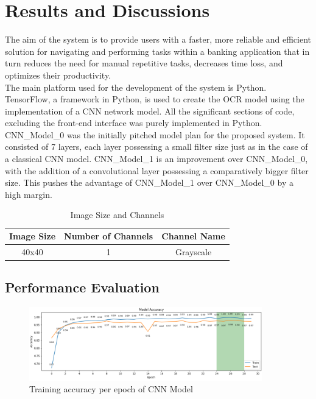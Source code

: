 \chapter{Results and Discussions}
\setcounter{equation}{0}

The aim of the system is to provide users with a faster, more reliable and efficient solution for navigating and performing tasks within a banking application that in turn reduces the need for manual repetitive tasks, decreases time loss, and optimizes their productivity.\\

\noindent The main platform used for the development of the system is Python. TensorFlow, a framework in Python, is used to create the OCR model using the implementation of a CNN network model. All the significant sections of code, excluding the front-end interface was purely implemented in Python.\\

\noindent
CNN\_Model\_0 was the initially pitched model plan for the proposed system. It consisted of 7 layers, each layer possessing a small filter size just as in the case of a classical CNN model. CNN\_Model\_1 is an improvement over CNN\_Model\_0, with the addition of a convolutional layer possessing a comparatively bigger filter size. This pushes the advantage of CNN\_Model\_1 over CNN\_Model\_0 by a high margin.\\
 
\begin{table}[ht]
\centering
\caption{Image Size and Channels}
\begin{tabular}{|c|c|c|}
\hline
Image Size & Number of Channels & Channel Name \\
\hline
40x40 & 1 & Grayscale \\
\hline
\end{tabular}
\end{table}

\clearpage

\section{Performance Evaluation}

\begin{figure}[h!]
    \centering
    \includegraphics[width=0.9\textwidth]{Images/Perf_Eval/acc_vs_epoch.png}
    \caption{Training accuracy per epoch of CNN Model}
\end{figure}

